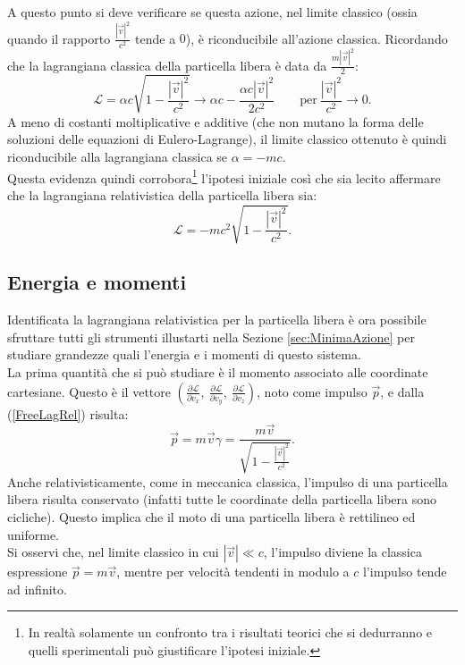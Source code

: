 A questo punto si deve verificare se questa azione, nel limite classico (ossia quando il rapporto $\frac{|\vec{v}|^2}{c^2}$ tende a $0$), è riconducibile all'azione classica. Ricordando che la lagrangiana classica della particella libera è data da $\frac{m|\vec{v}|^2}{2} $:
\begin{equation*}
    \mathcal{L} =\alpha c \sqrt{1-\frac{|\vec{v}|^2}{c^2}}\longrightarrow \alpha c - \frac{\alpha c |\vec{v}|^2}{2c^2}\qquad \text{per}\ \frac{|\vec{v}|^2}{c^2}\rightarrow 0.
\end{equation*}
A meno di costanti moltiplicative e additive (che non mutano la forma delle soluzioni delle equazioni di Eulero-Lagrange), il limite classico ottenuto è quindi riconducibile alla lagrangiana classica se $\alpha=-mc$.\\
Questa evidenza quindi corrobora\footnote{In realtà solamente un confronto tra i risultati teorici che si dedurranno e quelli sperimentali può giustificare l'ipotesi iniziale.} l'ipotesi iniziale così che sia lecito affermare che la lagrangiana relativistica della particella libera sia:
\begin{equation}\label{FreeLagRel}
    \mathcal{L} = -mc^2\sqrt{1-\frac{|\vec{v}|^2}{c^2}}.
\end{equation}
\subsection{Energia e momenti}\label{sec:LagRelEnMo}
Identificata la lagrangiana relativistica per la particella libera è ora possibile sfruttare tutti gli strumenti illustarti nella Sezione \ref{sec:MinimaAzione} per studiare grandezze quali l'energia e i momenti di questo sistema.\\

La prima quantità che si può studiare è il momento associato alle coordinate cartesiane. Questo è il vettore  $(\frac{\partial \mathcal{L} }{\partial v_x},\ \frac{\partial \mathcal{L} }{\partial v_y},\ \frac{\partial \mathcal{L} }{\partial v_z})$, noto come impulso $\vec p$, e dalla (\ref{FreeLagRel}) risulta:
\begin{equation}
    \vec{p}=m\vec{v}\gamma=\frac{m\vec{v}}{\sqrt{1-\frac{|\vec{v}|^2}{c^2}}}.
    \label{impulsoRel}
\end{equation}
Anche relativisticamente, come in meccanica classica, l'impulso di una particella libera risulta conservato (infatti tutte le coordinate della particella libera sono cicliche). Questo implica che il moto di una particella libera è rettilineo ed uniforme.\\
Si osservi che, nel limite classico in cui $|\vec{v}|\ll c$, l'impulso diviene la classica espressione $\vec p=m\vec v$, mentre per velocità tendenti in modulo a $c$ l'impulso tende ad infinito.\\

